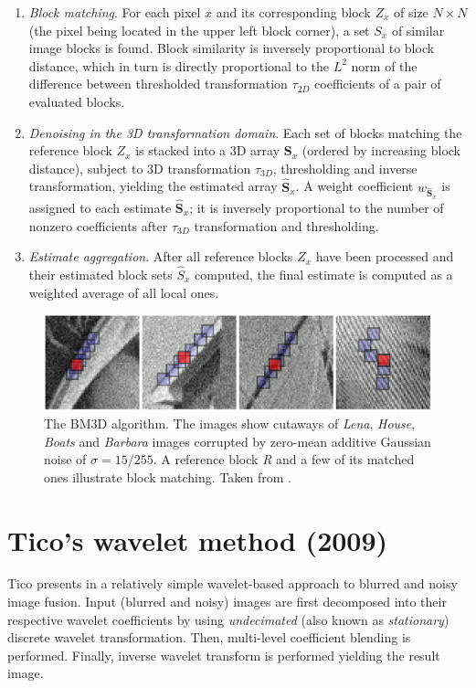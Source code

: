 \documentclass[12pt,notitlepage]{report}
\begin{document}
\begin{enumerate}
	\item {\em Block matching}. For each pixel $x$ and its corresponding block $Z_x$ of size $N \times N$ (the pixel being located in the upper left block corner), a set $S_x$ of similar image blocks is found. Block similarity is inversely proportional to block distance, which in turn is directly proportional to the $L^2$ norm of the difference between thresholded transformation $\tau_{2D}$ coefficients of a pair of evaluated blocks.
	\item {\em Denoising in the 3D transformation domain}. Each set of blocks matching the reference block $Z_x$ is stacked into a 3D array $\mathbf{S}_x$ (ordered by increasing block distance), subject to 3D transformation $\tau_{3D}$, thresholding and inverse transformation, yielding the estimated array $\hat{\mathbf{S}}_x$. A weight coefficient $w_{\hat{\mathbf{S}}_x}$ is assigned to each estimate $\hat{\mathbf{S}}_x$; it is inversely proportional to the number of nonzero coefficients after $\tau_{3D}$ transformation and thresholding.   
	\item {\em Estimate aggregation}. After all reference blocks $Z_x$ have been processed and their estimated block sets $\hat{S}_x$ computed, the final estimate is computed as a weighted average of all local ones.
\end{enumerate}
\begin{figure}[htb]
 \centering
  \includegraphics[width=12cm]{bm3d_matching_blocks.png}
 \caption[The BM3D algorithm.]{The BM3D algorithm. The images show cutaways of {\em Lena}, {\em House}, {\em Boats} and {\em Barbara} images corrupted by zero-mean additive Gaussian noise of $\sigma = 15/255$. A reference block {\em R} and a few of its matched ones illustrate block matching. Taken from \cite{bm3d}.}
 \label{fig:bm3d_example}
\end{figure}

\section{Tico's wavelet method (2009)}
\label{sec:tico09}

Tico presents in \cite{tico09} a relatively simple wavelet-based approach to blurred and noisy image fusion. Input (blurred and noisy) images are first decomposed into their respective wavelet coefficients by using  {\em undecimated} (also known as {\em stationary}) discrete wavelet transformation. Then, multi-level coefficient blending is performed. Finally, inverse wavelet transform is performed yielding the result image.
\end{document}
